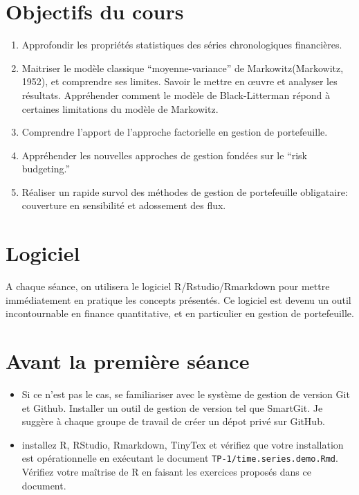 \documentclass[
  11pt,
]{article}
\begin{document}
\hypertarget{objectifs-du-cours}{%
\section{Objectifs du cours}\label{objectifs-du-cours}}

\begin{enumerate}
\def\labelenumi{\arabic{enumi}.}
\item
  Approfondir les propriétés statistiques des séries chronologiques
  financières.
\item
  Maitriser le modèle classique ``moyenne-variance'' de
  Markowitz(Markowitz, 1952), et comprendre ses limites. Savoir le
  mettre en œuvre et analyser les résultats. Appréhender comment le
  modèle de Black-Litterman répond à certaines limitations du modèle de
  Markowitz.
\item
  Comprendre l'apport de l'approche factorielle en gestion de
  portefeuille.
\item
  Appréhender les nouvelles approches de gestion fondées sur le ``risk
  budgeting.''
\item
  Réaliser un rapide survol des méthodes de gestion de portefeuille
  obligataire: couverture en sensibilité et adossement des flux.
\end{enumerate}

\hypertarget{logiciel}{%
\section{Logiciel}\label{logiciel}}

A chaque séance, on utilisera le logiciel R/Rstudio/Rmarkdown pour
mettre immédiatement en pratique les concepts présentés. Ce logiciel est
devenu un outil incontournable en finance quantitative, et en
particulier en gestion de portefeuille.

\hypertarget{avant-la-premiuxe8re-suxe9ance}{%
\section{Avant la première
séance}\label{avant-la-premiuxe8re-suxe9ance}}

\begin{itemize}
\item
  Si ce n'est pas le cas, se familiariser avec le système de gestion de
  version Git et Github. Installer un outil de gestion de version tel
  que SmartGit. Je suggère à chaque groupe de travail de créer un dépot
  privé sur GitHub.
\item
  installez R, RStudio, Rmarkdown, TinyTex et vérifiez que votre
  installation est opérationnelle en exécutant le document
  \texttt{TP-1/time.series.demo.Rmd}. Vérifiez votre maîtrise de R en
  faisant les exercices proposés dans ce document.
\end{itemize}
\end{document}
